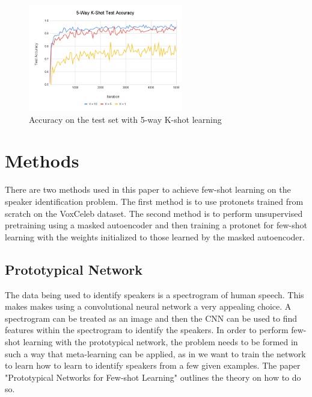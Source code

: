 \documentclass{article}
\begin{document}

\begin{figure}
  \centering
  \includegraphics[width=0.6\textwidth]{Images/5-Way K-Shot Test Accuracy.png}
  \caption{Accuracy on the test set with 5-way K-shot learning}
  \label{fig:FiveWayAccuracy}
\end{figure}

\section{ Methods }
There are two methods used in this paper to achieve few-shot learning on the speaker identification problem. The first
method is to use protonets trained from scratch on the VoxCeleb dataset. The second method is to perform unsupervised
pretraining using a masked autoencoder and then training a protonet for few-shot learning with the weights initialized
to those learned by the masked autoencoder.

\subsection{Prototypical Network}
The data being used to identify speakers is a spectrogram of human speech. This makes makes using a convolutional neural network
a very appealing choice. A spectrogram can be treated as an image and then the CNN can be used to find features within
the spectrogram to identify the speakers. In order to perform few-shot learning with the prototypical network, the problem
needs to be formed in such a way that meta-learning can be applied, as in we want to train the network to learn how to learn
to identify speakers from a few given examples. The paper "Prototypical Networks for Few-shot Learning" \cite{DBLP:journals/corr/SnellSZ17}
outlines the theory on how to do so.
\end{document}
